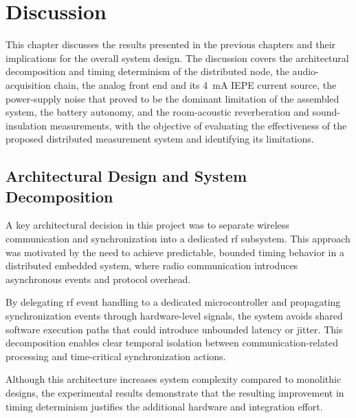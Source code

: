 \chapter{Discussion} 

This chapter discusses the results presented in the previous chapters and their implications for the overall system design. The discussion covers the architectural decomposition and timing determinism of the distributed node, the audio-acquisition chain, the analog front end and its \SI{4}{\milli\ampere} IEPE current source, the power-supply noise that proved to be the dominant limitation of the assembled system, the battery autonomy, and the room-acoustic reverberation and sound-insulation measurements, with the objective of evaluating the effectiveness of the proposed distributed measurement system and identifying its limitations.

\section{Architectural Design and System Decomposition}

A key architectural decision in this project was to separate wireless communication and synchronization into a dedicated \acrshort{rf} subsystem. This approach was motivated by the need to achieve predictable, bounded timing behavior in a distributed embedded system, where radio communication introduces asynchronous events and protocol overhead.

By delegating \acrshort{rf} event handling to a dedicated microcontroller and propagating synchronization events through hardware-level signals, the system avoids shared software execution paths that could introduce unbounded latency or jitter. This decomposition enables clear temporal isolation between communication-related processing and time-critical synchronization actions.

Although this architecture increases system complexity compared to monolithic designs, the experimental results demonstrate that the resulting improvement in timing determinism justifies the additional hardware and integration effort.

